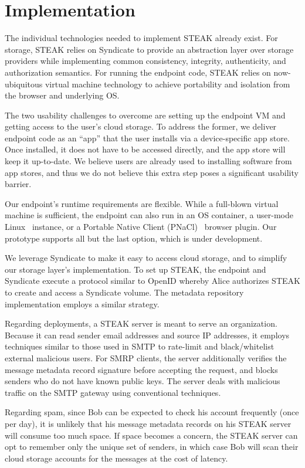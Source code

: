 \section{Implementation}

The individual technologies needed to implement STEAK already exist.  For storage, STEAK relies on Syndicate to provide an abstraction layer over storage providers while implementing common consistency, integrity, authenticity, and authorization semantics.  For running the endpoint code, STEAK relies on now-ubiquitous virtual machine technology to achieve portability and isolation from the browser and underlying OS.

The two usability challenges to overcome are setting up the endpoint VM and getting access to the user’s cloud storage.  To address the former, we deliver endpoint code as an “app” that the user installs via a device-specific app store.  Once installed, it does not have to be accessed directly, and the app store will keep it up-to-date.  We believe users are already used to installing software from app stores, and thus we do not believe this extra step poses a significant usability barrier.

Our endpoint’s runtime requirements are flexible.  While a full-blown virtual machine is sufficient, the endpoint can also run in an OS container, a user-mode Linux~\cite{usermode-linux} instance, or a Portable Native Client (PNaCl)~\cite{pnacl} browser plugin.  Our prototype supports all but the last option, which is under development.

We leverage Syndicate to make it easy to access cloud storage, and to simplify our storage layer’s implementation.  To set up STEAK, the endpoint and Syndicate execute a protocol similar to OpenID whereby Alice authorizes STEAK to create and access a Syndicate volume.  The metadata repository implementation employs a similar strategy.

Regarding deployments, a STEAK server is meant to serve an organization.  Because it can read sender email addresses and source IP addresses, it employs techniques similar to those used in SMTP to rate-limit and black/whitelist external malicious users.  For SMRP clients, the server additionally verifies the message metadata record signature before accepting the request, and blocks senders who do not have known public keys.  The server deals with malicious traffic on the SMTP gateway using conventional techniques.

Regarding spam, since Bob can be expected to check his account frequently (once per day), it is unlikely that his message metadata records on his STEAK server will consume too much space.  If space becomes a concern, the STEAK server can opt to remember only the unique set of senders, in which case Bob will scan their cloud storage accounts for the messages at the cost of latency.

